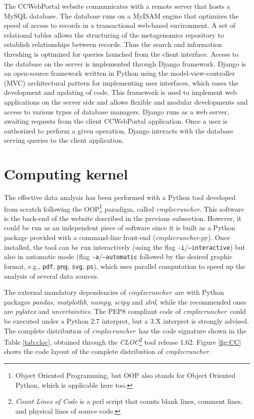 \documentclass[12pt,oneside,letterpaper]{article}
\newcommand{\CC}[0]{\emph{cmplxcruncher}}
\begin{document}
The CCWebPortal website communicates with a remote server that hosts a MySQL database. The database runs on a MyISAM engine that optimizes the speed of access to records in a transactional web-based environment. A set of relational tables allows the structuring of the metagenomics repository to establish relationships between records. Thus the search and information threshing is optimized for queries launched from the client interface. Access to the database on the server is implemented through Django framework. Django is an open-source framework written in Python using the model-view-controller (MVC) architectural pattern for implementing user interfaces, which eases the development and updating of code. This framework is used to implement web applications on the server side and allows flexible and modular developments and access to various types of database managers. Django runs as a web server, awaiting requests from the client CCWebPortal application. Once a user is authorized to perform a given operation, Django interacts with the database serving queries to the client application.

\section{Computing kernel}

The effective data analysis has been performed with a Python tool developed from scratch following the OOP\footnote{Object Oriented Programming, but OOP also stands for Object Oriented Python, which is applicable here too.} paradigm, called \CC. This software is the back-end of the website described in the previous subsection. However, it could be run as an independent piece of software since it is built as a Python package provided with a command-line front-end (\CC.py). Once installed, the tool can be run interactively (using the flag \texttt{-i}/\texttt{--interactive}) but also in automatic mode (flag \texttt{-a}/\texttt{--automatic} followed by the desired graphic format, e.g., \texttt{pdf}, \texttt{png}, \texttt{svg}, \texttt{ps}), which uses parallel computation to speed up the analysis of several data sources. 

The external mandatory dependencies of \CC\ are with Python packages \emph{pandas}, \emph{matplotlib}, \emph{numpy}, \emph{scipy} and \emph{xlrd}, while the recommended ones are \emph{pylatex} and \emph{uncertainties}. The PEP8 compliant code of \CC\ could be executed under a Python 2.7 interpret, but a 3.X interpret is strongly advised. The complete distribution of \CC\ has the code signature shown in the Table \ref{tab:cloc}, obtained through the \emph{CLOC}\footnote{\emph{Count Lines of Code} is a perl script that counts blank lines, comment lines, and physical lines of source code.} tool release 1.62. Figure \ref{fig:CC} shows the code layout of the complete distribution of \CC.
\end{document}
